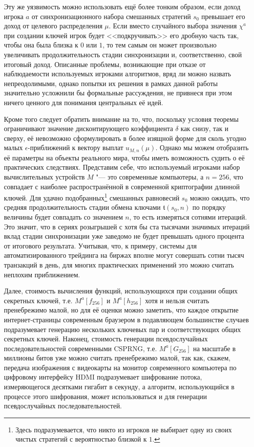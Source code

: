Эту же уязвимость можно использовать ещё более тонким образом, если доход игрока $a$ от синхронизационного набора смешанных стратегий $s_0$ превышает его доход от целевого распределения $\mu$. Если вместо случайного выбора значения $\chi^a$ при создании ключей игрок будет <<подкручивать>> его дробную часть так, чтобы она была близка к $0$ или $1$, то тем самым он может произвольно увеличивать продолжительность стадии синхронизации и, соответственно, свой итоговый доход. Описанные проблемы, возникающие при отказе от наблюдаемости используемых игроками алгоритмов, вряд ли можно назвать непреодолимыми, однако попытки их решения в рамках данной работы значительно усложнили бы формальные рассуждения, не привнеся при этом ничего ценного для понимания центральных её идей.

Кроме того следует обратить внимание на то, что, поскольку условия теоремы ограничивают значение дисконтирующего коэффициента $\delta$ как снизу, так и сверху, её невозможно сформулировать в более изящной форме для сколь угодно малых $\epsilon$-приближений к вектору выплат $u_{M,n}(\mu)$. Однако мы можем отобразить её параметры на объекты реального мира, чтобы иметь возможность судить о её практических следствиях. Представим себе, что используемый игроками набор вычислительных устройств $M$ "--- это современные компьютеры, а $n = 256$, что совпадает с наиболее распространённой в современной криптографии длинной ключей. Для удачно подобранных\footnote{Здесь подразумевается, что никто из игроков не выбирает одну из своих чистых стратегий с вероятностью близкой к $1$.} смешанных равновесий $s_0$ можно ожидать, что средняя продолжительность стадии обмена ключами $\mathfrak{t}(s_0, n)$ по порядку величины будет совпадать со значением $n$, то есть измеряться сотнями итераций. Это значит, что в сериях розыгрышей с хотя бы ста тысячами значимых итераций вклад стадии синхронизации уже заведомо не будет превышать одного процента от итогового результата. Учитывая, что, к примеру, системы для автоматизированного трейдинга на биржах вполне могут совершать сотни тысяч транзакций в день, для многих практических применений это можно считать неплохим приближением.

Далее, стоимость вычисления функций, использующихся при создании общих секретных ключей, т.е. $M^a[f_{256}]$ и $M^a[h_{256}]$ хотя и нельзя считать пренебрежимо малой, но для её оценки можно заметить, что каждое открытие интернет-страницы современным браузером в подавляющем большинстве случаев подразумевает генерацию нескольких ключевых пар и соответствующих общих секретных ключей. Наконец, стоимость генерации псевдослучайных последовательностей современными CSPRNG, т.е. $M^a[G_{256}]$ на масштабе в миллионы битов уже можно считать пренебрежимо малой, так как, скажем, передача изображения с видеокарты на монитор современного компьютера по цифровому интерфейсу HDMI подразумевает шифрование потока, измеряющегося десятками гигабит в секунду, а алгоритм, использующийся в процессе этого шифрования, может использоваться и для генерации псевдослучайных последовательностей.

